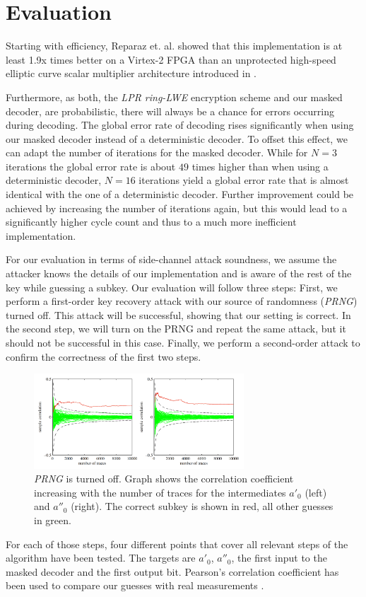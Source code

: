 \section{Evaluation}
Starting with efficiency, Reparaz et. al. showed that this implementation is at least 1.9x times better on a Virtex-2 FPGA than an unprotected high-speed elliptic curve scalar multiplier architecture introduced in \cite{Rebeiro2012}.

Furthermore, as both, the \textit{\ac{LPR} \ac{ring-LWE}} encryption scheme and our masked decoder, are probabilistic, there will always be a chance for errors occurring during decoding. The global error rate of decoding rises significantly when using our masked decoder instead of a deterministic decoder. To offset this effect, we can adapt the number of iterations for the masked decoder. While for \(N=3\) iterations the global error rate is about \(49\) times higher than when using a deterministic decoder, \(N=16\) iterations yield a global error rate that is almost identical with the one of a deterministic decoder. Further improvement could be achieved by increasing the number of iterations again, but this would lead to a significantly higher cycle count and thus to a much more inefficient implementation.

For our evaluation in terms of side-channel attack soundness, we assume the attacker knows the details of our implementation and is aware of the rest of the key while guessing a subkey. Our evaluation will follow three steps: First, we perform a first-order key recovery attack with our source of randomness (\textit{\acs{PRNG}}) turned off. This attack will be successful, showing that our setting is correct. In the second step, we will turn on the PRNG and repeat the same attack, but it should not be successful in this case. Finally, we perform a second-order attack to confirm the correctness of the first two steps.
\begin{figure}[H]
	\centering
	\includegraphics[width=0.7\textwidth]{dpa_1.png}
	\caption{\textit{\acs{PRNG}} is turned off. Graph shows the correlation coefficient increasing with the number of traces for the intermediates \(a'_0\) (left) and \(a''_0\) (right). The correct subkey is shown in red, all other guesses in green. \cite{maskedRing}}
	\label{dpa_1}
\end{figure}
For each of those steps, four different points that cover all relevant steps of the algorithm have been tested. The targets are \(a'_0\), \(a''_0\), the first input to the masked decoder and the first output bit. Pearson's correlation coefficient has been used to compare our guesses with real measurements \cite{Brier2004}.

